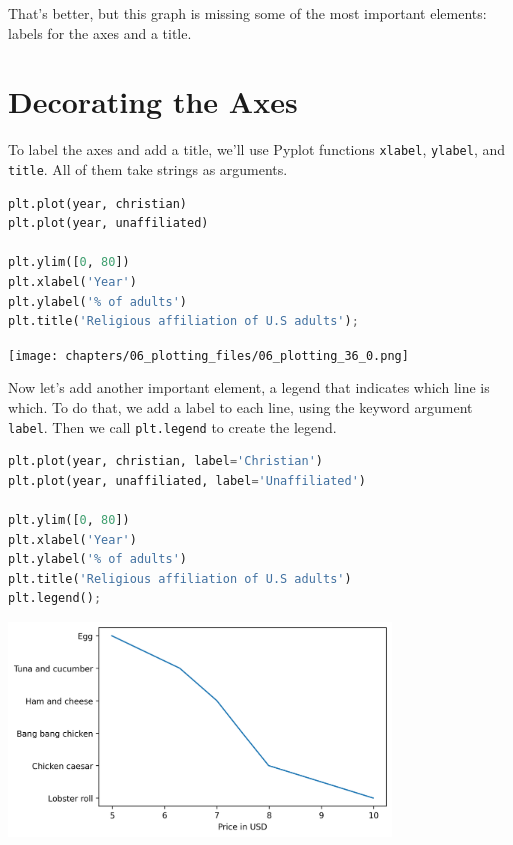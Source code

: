 That's better, but this graph is missing some of the most important
elements: labels for the axes and a title.

\hypertarget{decorating-the-axes}{%
\section{Decorating the Axes}\label{decorating-the-axes}}

To label the axes and add a title, we'll use Pyplot functions
\passthrough{\lstinline!xlabel!}, \passthrough{\lstinline!ylabel!}, and
\passthrough{\lstinline!title!}. All of them take strings as arguments.

\begin{lstlisting}[language=Python,style=source]
plt.plot(year, christian)
plt.plot(year, unaffiliated)

plt.ylim([0, 80])
plt.xlabel('Year')
plt.ylabel('% of adults')
plt.title('Religious affiliation of U.S adults');
\end{lstlisting}

\begin{center}
\texttt{[image: chapters/06\_plotting\_files/06\_plotting\_36\_0.png]}
\end{center}

Now let's add another important element, a legend that indicates which
line is which. To do that, we add a label to each line, using the
keyword argument \passthrough{\lstinline!label!}. Then we call
\passthrough{\lstinline!plt.legend!} to create the legend.

\begin{lstlisting}[language=Python,style=source]
plt.plot(year, christian, label='Christian')
plt.plot(year, unaffiliated, label='Unaffiliated')

plt.ylim([0, 80])
plt.xlabel('Year')
plt.ylabel('% of adults')
plt.title('Religious affiliation of U.S adults')
plt.legend();
\end{lstlisting}

\begin{center}
\includegraphics[width=4in]{chapters/06_plotting_files/06_plotting_38_0.png}
\end{center}

